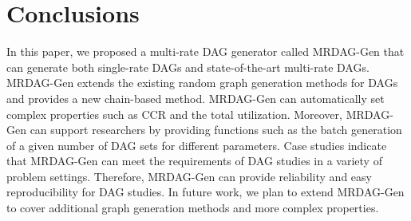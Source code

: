 \section{Conclusions}
\label{sec: conclusion}

In this paper, we proposed a multi-rate DAG generator called MRDAG-Gen that can generate both single-rate DAGs and state-of-the-art multi-rate DAGs.
MRDAG-Gen extends the existing random graph generation methods for DAGs and provides a new chain-based method.
MRDAG-Gen can automatically set complex properties such as CCR and the total utilization.
Moreover, MRDAG-Gen can support researchers by providing functions such as the batch generation of a given number of DAG sets for different parameters.
Case studies indicate that MRDAG-Gen can meet the requirements of DAG studies in a variety of problem settings.
Therefore, MRDAG-Gen can provide reliability and easy reproducibility for DAG studies.
In future work, we plan to extend MRDAG-Gen to cover additional graph generation methods and more complex properties.
